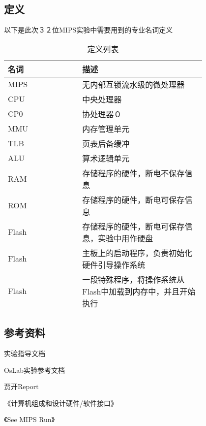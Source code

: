     \subsection{定义}
        以下是此次３２位MIPS实验中需要用到的专业名词定义
        \begin{longtable}{|p{0.3\linewidth}|p{0.5\linewidth}|}
        \caption{定义列表}
        \hline
        名词　& 描述　\\
        \hline
        MIPS & 无内部互锁流水级的微处理器 \\
        \hline
        CPU &  中央处理器\\
        \hline
        CP0 & 协处理器０ \\
        \hline
        MMU & 内存管理单元 \\
        \hline
        TLB & 页表后备缓冲 \\
        \hline
        ALU & 算术逻辑单元 \\
        \hline
        RAM & 存储程序的硬件，断电不保存信息 \\
        \hline
        ROM & 存储程序的硬件，断电可保存信息 \\
        \hline
        Flash & 存储程序的硬件，断电可保存信息，实验中用作硬盘 \\
        \hline
        Flash & 主板上的启动程序，负责初始化硬件引导操作系统 \\
        \hline
        Flash & 一段特殊程序，将操作系统从Flash中加载到内存中，并且开始执行 \\
        \hline
        \end{longtable}

    \subsection{参考资料}
        实验指导文档

        OsLab实验参考文档

        贾开Report

        《计算机组成和设计硬件/软件接口》

        《See MIPS Run》



